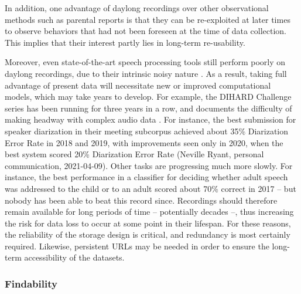 \documentclass[smallextended]{svjour3}       %
\begin{document}
In addition, one advantage of daylong recordings over other observational methods such as parental reports is that they can be re-exploited at later times to observe behaviors that had not been foreseen at the time of data collection. This implies that their interest partly lies in long-term re-usability.

Moreover, even state-of-the-art speech processing tools still perform poorly on daylong recordings, due to their intrinsic noisy nature \citep{casillas2019step}. As a result, taking full advantage of present data will necessitate new or improved computational models, which may take years to develop. For example, the DIHARD Challenge series has been running for three years in a row, and documents the difficulty of making headway with complex audio data \citep{ryant2018first,ryant2019second,ryant2020third}. For instance, the best submission for speaker diarization in their meeting subcorpus achieved about 35\% Diarization Error Rate in 2018 and 2019, with improvements seen only in 2020, when the best system scored 20\% Diarization Error Rate (Neville Ryant, personal communication, 2021-04-09). Other tasks are progressing much more slowly. For instance, the best performance in a classifier for deciding whether adult speech was addressed to the child or to an adult scored about 70\% correct in 2017 \citep{schuller2017interspeech} -- but nobody has been able to beat this record since. Recordings should therefore remain available for long periods of time -- potentially decades --, thus increasing the risk for data loss to occur at some point in their lifespan. For these reasons, the reliability of the storage design is critical, and redundancy is most certainly required. Likewise, persistent URLs may be needed in order to ensure the long-term accessibility of the datasets.

\subsubsection*{Findability}
\end{document}
